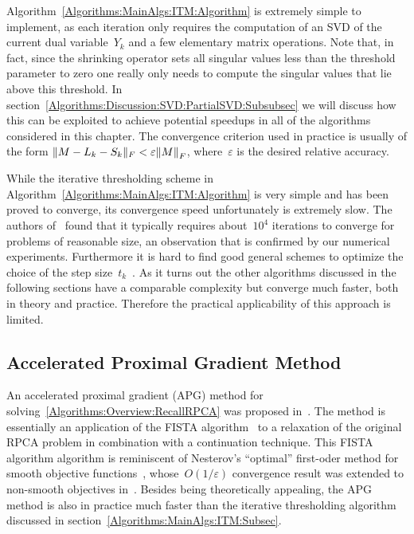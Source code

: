 Algorithm~\ref{Algorithms:MainAlgs:ITM:Algorithm} is extremely simple to implement, as each iteration only requires the computation of an SVD of the current dual variable~$Y_k$ and a few elementary matrix operations. Note that, in fact, since the shrinking operator sets all singular values less than the threshold parameter to zero one really only needs to compute the singular values that lie above this threshold. In section~\ref{Algorithms:Discussion:SVD:PartialSVD:Subsubsec} we will discuss how this can be exploited to achieve potential speedups in all of the algorithms considered in this chapter. The convergence criterion used in practice is usually of the form $\|M-L_k-S_k\|_F < \varepsilon {\left\|M\right\|}_{F}^{}$, where~$\varepsilon$ is the desired relative accuracy. 

While the iterative thresholding scheme in Algorithm~\ref{Algorithms:MainAlgs:ITM:Algorithm} is very simple and has been proved to converge, its convergence speed unfortunately is extremely slow. The authors of~\cite{Wright:2009fk} found that it typically requires about~$10^4$ iterations to converge for problems of reasonable size, an observation that is confirmed by our numerical experiments. Furthermore it is hard to find good general schemes to optimize the choice of the step size~$t_k$~\cite{Lin:2010fk}. As it turns out the other algorithms discussed in the following sections have a comparable complexity but converge much faster, both in theory and practice. Therefore the practical applicability of this approach is limited.


\subsection{Accelerated Proximal Gradient Method}
\label{Algorithms:MainAlgs:PGM:Subsec}

An accelerated proximal gradient (APG) method for solving~\eqref{Algorithms:Overview:RecallRPCA} was proposed in~\cite{Lin:2009kx}. The method is essentially an application of the FISTA algorithm~\cite{Beck:2009kx} to a relaxation of the original RPCA problem in combination with a continuation technique. This FISTA algorithm algorithm is reminiscent of Nesterov's ``optimal'' first-oder method for smooth objective functions~\cite{Nesterov:1983uq}, whose~$O(1/\varepsilon)$ convergence result was extended to non-smooth objectives in~\cite{Nesterov:2007kx}. Besides being theoretically appealing, the APG method is also in practice much faster than the iterative thresholding algorithm discussed in section~\ref{Algorithms:MainAlgs:ITM:Subsec}.\\

